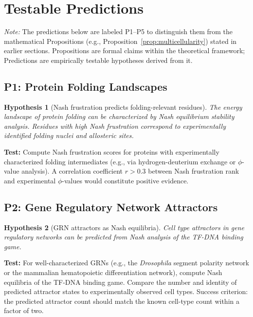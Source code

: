 \documentclass[12pt,a4paper]{article}
\newtheorem{hypothesis}{Hypothesis}
\theoremstyle{remark}
\begin{document}
\section{Testable Predictions}
\label{sec:predictions}

\noindent\textit{Note:} The predictions below are labeled P1--P5 to distinguish them from the mathematical Propositions (e.g., Proposition~\ref{prop:multicellularity}) stated in earlier sections. Propositions are formal claims within the theoretical framework; Predictions are empirically testable hypotheses derived from it.

\subsection{P1: Protein Folding Landscapes}

\begin{hypothesis}[Nash frustration predicts folding-relevant residues]
The energy landscape of protein folding can be characterized by Nash equilibrium stability analysis. Residues with high Nash frustration correspond to experimentally identified folding nuclei and allosteric sites.
\end{hypothesis}

\textbf{Test:} Compute Nash frustration scores for proteins with experimentally characterized folding intermediates (e.g., via hydrogen-deuterium exchange or $\phi$-value analysis). A correlation coefficient $r > 0.3$ between Nash frustration rank and experimental $\phi$-values would constitute positive evidence.

\subsection{P2: Gene Regulatory Network Attractors}

\begin{hypothesis}[GRN attractors as Nash equilibria]
Cell type attractors in gene regulatory networks can be predicted from Nash analysis of the TF-DNA binding game.
\end{hypothesis}

\textbf{Test:} For well-characterized GRNs (e.g., the \textit{Drosophila} segment polarity network or the mammalian hematopoietic differentiation network), compute Nash equilibria of the TF-DNA binding game. Compare the number and identity of predicted attractor states to experimentally observed cell types. Success criterion: the predicted attractor count should match the known cell-type count within a factor of two.
\end{document}
